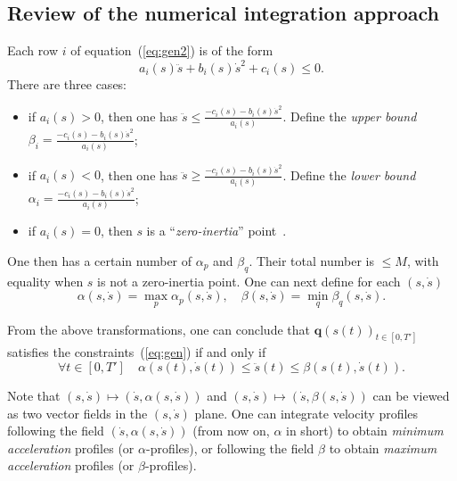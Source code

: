 \documentclass[9pt,technote]{IEEEtran}
\newcommand{\bfq}{\mathbf{q}}
\begin{document}
\subsection{Review of the numerical integration approach}
\label{sec:overview}

Each row $i$ of equation~(\ref{eq:gen2}) is of the form
\[
a_i(s)\ddot s + b_i(s)\dot s^2 + c_i(s) \leq 0.
\]
There are three cases:
\begin{itemize}
\item if $a_i(s)>0$, then one has $\ddot s \leq
  \frac{-c_i(s)-b_i(s)\dot s^2}{a_i(s)}$.  Define the \emph{upper
    bound} $\beta_i=\frac{-c_i(s)-b_i(s)\dot s^2}{a_i(s)}$;
\item if $a_i(s)<0$, then one has $\ddot s \geq
  \frac{-c_i(s)-b_i(s)\dot s^2}{a_i(s)}$. Define the \emph{lower
    bound} $\alpha_i=\frac{-c_i(s)-b_i(s)\dot s^2}{a_i(s)}$;
\item if $a_i(s)=0$, then $s$ is a
  ``\emph{zero-inertia}'' point~\cite{PJ87jra,SL92jdsmc}.
\end{itemize}

One then has a certain number of $\alpha_p$ and $\beta_q$. Their total
number is $\leq M$, with equality when $s$ is not a zero-inertia
point.  One can next define for each $(s,\dot s)$
\begin{equation}
  \label{eq:tata}
  \alpha(s,\dot s)=\max_p \alpha_p(s,\dot s),\nonumber \quad
  \beta(s,\dot s)=\min_q \beta_q(s,\dot s).\nonumber 
\end{equation}

From the above transformations, one can conclude that
$\bfq(s(t))_{t\in[0,T']}$ satisfies the constraints~(\ref{eq:gen}) if
and only if
\begin{equation}
\label{eq:bounds}
\forall t\in[0,T']\quad \alpha(s(t),\dot s(t)) \leq \ddot s(t) \leq
\beta(s(t),\dot s(t)).  
\end{equation}

Note that $(s,\dot s)\mapsto(\dot s,\alpha(s,\dot s))$ and $(s,\dot
s)\mapsto(\dot s,\beta(s,\dot s))$ can be viewed as two vector fields
in the $(s,\dot s)$ plane. One can integrate velocity profiles
following the field $(\dot s,\alpha(s,\dot s))$ (from now on, $\alpha$
in short) to obtain \emph{minimum acceleration} profiles (or
$\alpha$-profiles), or following the field $\beta$ to obtain
\emph{maximum acceleration} profiles (or $\beta$-profiles).
\end{document}
